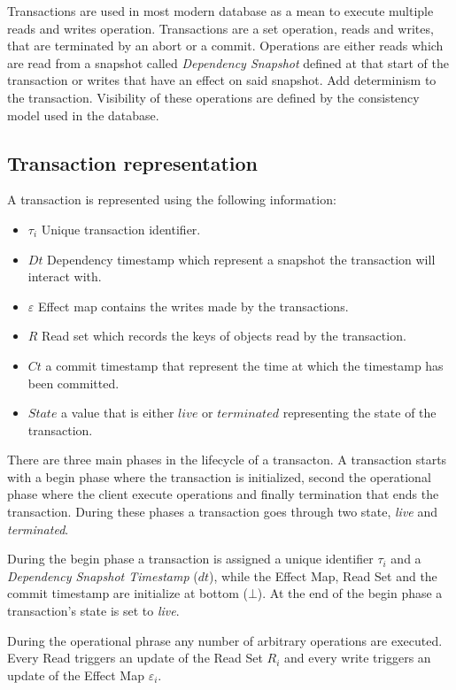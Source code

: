 \documentclass[parallelisme]{compas2022}
\begin{document}
Transactions are used in most modern database as a mean to execute multiple reads and writes operation.
Transactions are a set operation, reads and writes, that are terminated by an abort or a commit.
Operations are either reads which are read from a snapshot called \emph{Dependency Snapshot} defined at that start of the transaction or writes that have an effect on said snapshot. Add determinism to the transaction.
Visibility of these operations are defined by the consistency model used in the database.


\subsection{Transaction representation}

A transaction is represented using the following information:
\begin{itemize}
\item $\tau_i$ Unique transaction identifier.
\item $Dt$ Dependency timestamp which represent a snapshot the transaction will interact with.
\item $\varepsilon$ Effect map contains the writes made by the transactions.
\item $R$ Read set which records the keys of objects read by the transaction.
\item $Ct$ a commit timestamp that represent the time at which the timestamp has been committed.
\item $State$ a value that is either $live$ or $terminated$ representing the state of the transaction.\\
\end{itemize}

There are three main phases in the lifecycle of a transacton.
A transaction starts with a begin phase where the transaction is initialized, second the operational phase where the client execute operations and finally termination that ends the transaction.
During these phases a transaction goes through two state, \emph{live} and \emph{terminated}.

During the begin phase a transaction is assigned a unique identifier $\tau_i$ and a \emph{Dependency Snapshot Timestamp} ($dt$), while the Effect Map, Read Set and the commit timestamp are initialize at bottom ($\bot$).
At the end of the begin phase a transaction's state is set to \emph{live}.

During the operational phrase any number of arbitrary operations are executed.
Every Read triggers an update of the Read Set $R_i$ and every write triggers an update of the Effect Map $\varepsilon_i$.
\end{document}
